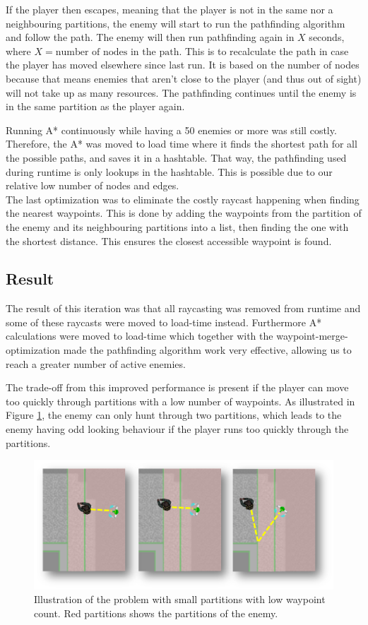 If the player then escapes, meaning that the player is not in the same nor a neighbouring partitions, the enemy will start to run the pathfinding algorithm and follow the path.
The enemy will then run pathfinding again in $X$ seconds, where $X = \text{number of nodes in the path}$.
This is to recalculate the path in case the player has moved elsewhere since last run.
It is based on the number of nodes because that means enemies that aren't close to the player (and thus out of sight) will not take up as many resources.
The pathfinding continues until the enemy is in the same partition as the player again.

Running A* continuously while having a 50 enemies or more was still costly.
Therefore, the A* was moved to load time where it finds the shortest path for all the possible paths, and saves it in a hashtable.
That way, the pathfinding used during runtime is only lookups in the hashtable.
This is possible due to our relative low number of nodes and edges.\\
The last optimization was to eliminate the costly raycast happening when finding the nearest waypoints. 
This is done by adding the waypoints from the partition of the enemy and its neighbouring partitions into a list, then finding the one with the shortest distance. 
This ensures the closest accessible waypoint is found.

\subsection*{Result}
The result of this iteration was that all raycasting was removed from runtime and some of these raycasts were moved to load-time instead.
Furthermore A* calculations were moved to load-time which together with the waypoint-merge-optimization made the pathfinding algorithm work very effective, allowing us to reach a greater number of active enemies.

The trade-off from this improved performance is present if the player can move too quickly through partitions with a low number of waypoints.
As illustrated in Figure \ref{tradeoff}, the enemy can only hunt through two partitions, which leads to the enemy having odd looking behaviour if the player runs too quickly through the partitions.
\begin{figure}[H]
\begin{center}
        \includegraphics[width=\textwidth]{figures/astar/tradeoff.png}
    \caption{Illustration of the problem with small partitions with low waypoint count. Red partitions shows the partitions of the enemy.}\label{tradeoff}
\end{center}
\end{figure}